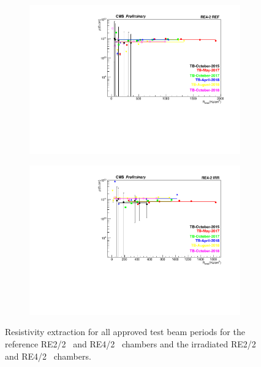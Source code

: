 \begin{figure}[H]
\begin{subfigure}{0.5\linewidth}
    		\includegraphics[width = \linewidth]{fig/chapt5/Resistivity-vs-Rate-CERN-165.pdf}
        	\caption{\label{fig:Resistivity-Fit:C}}
    	\end{subfigure}
    	\begin{subfigure}{0.5\linewidth}
			\centering
    		\includegraphics[width = \linewidth]{fig/chapt5/Resistivity-vs-Rate-CERN-166.pdf}
        	\caption{\label{fig:Resistivity-Fit:D}}
    	\end{subfigure}
		\caption{\label{fig:Resistivity-Fit} Resistivity extraction for all approved test beam periods for the reference RE2/2~ and RE4/2~ chambers and the irradiated RE2/2~ and RE4/2~ chambers.}
	\end{figure}
	

